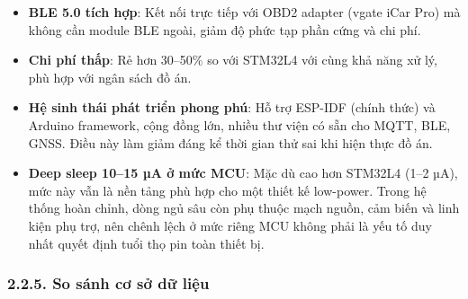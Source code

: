 \documentclass[a4paper]{extarticle}
\providecommand{\tightlist}{%
  \setlength{\itemsep}{0pt}\setlength{\parskip}{0pt}}
\begin{document}
\begin{itemize}
\tightlist
\item
  \textbf{BLE 5.0 tích hợp}: Kết nối trực tiếp với OBD2 adapter (vgate
  iCar Pro) mà không cần module BLE ngoài, giảm độ phức tạp phần cứng và
  chi phí.
\item
  \textbf{Chi phí thấp}: Rẻ hơn 30--50\% so với STM32L4 với cùng khả
  năng xử lý, phù hợp với ngân sách đồ án.
\item
  \textbf{Hệ sinh thái phát triển phong phú}: Hỗ trợ ESP-IDF (chính
  thức) và Arduino framework, cộng đồng lớn, nhiều thư viện có sẵn cho
  MQTT, BLE, GNSS. Điều này làm giảm đáng kể thời gian thử sai khi hiện
  thực đồ án.
\item
  \textbf{Deep sleep 10--15 µA ở mức MCU}: Mặc dù cao hơn STM32L4 (1--2
  µA), mức này vẫn là nền tảng phù hợp cho một thiết kế low-power. Trong
  hệ thống hoàn chỉnh, dòng ngủ sâu còn phụ thuộc mạch nguồn, cảm biến
  và linh kiện phụ trợ, nên chênh lệch ở mức riêng MCU không phải là yếu
  tố duy nhất quyết định tuổi thọ pin toàn thiết bị.
\end{itemize}

\subsubsection{2.2.5. So sánh cơ sở dữ
liệu}\label{225-so-suxe1nh-cux1a1-sux1edf-dux1eef-liux1ec7u}
\end{document}
